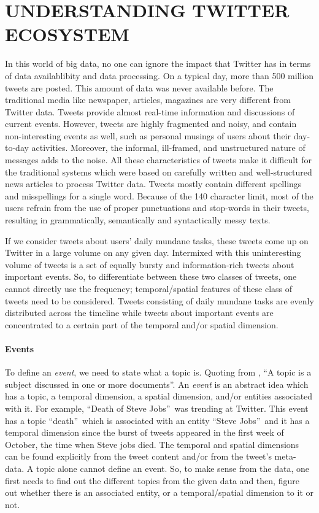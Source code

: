 \section{\uppercase{Understanding Twitter Ecosystem}}
In this world of big data, no one can ignore the impact that Twitter has in terms of data availablibity and data processing. On a typical day, more than 500 million tweets are posted. This amount of data was never available before. The traditional media like newspaper, articles, magazines are very different from Twitter data. Tweets provide almost real-time information and discussions of current events. However, tweets are highly fragmented and noisy, and contain non-interesting events as well, such as personal musings of users about their day-to-day activities. Moreover, the informal, ill-framed, and unstructured nature of messages adds to the noise. All these characteristics of tweets make it difficult for the traditional systems which were based on carefully written and well-structured news articles to process Twitter data. Tweets mostly contain different spellings and misspellings for a single word. Because of the 140 character limit, most of the users refrain from the use of proper punctuations and stop-words in their tweets, resulting in grammatically, semantically and syntactically messy texts.

If we consider tweets about users' daily mundane tasks, these tweets come up on Twitter in a large volume on any given day. Intermixed with this uninteresting volume of tweets is a set of equally bursty and information-rich tweets about important events. So, to differentiate between these two classes of tweets, one cannot directly use the frequency; temporal/spatial features of these class of tweets need to be considered. Tweets consisting of daily mundane tasks are evenly distributed across the timeline while tweets about important events are concentrated to a certain part of the temporal and/or spatial dimension.

\paragraph{Events}
To define an \emph{event}, we need to state what a topic is. Quoting from \cite{zhao2011comparing}, \textquotedblleft A topic is a subject discussed in one or more documents\textquotedblright. An \emph{event} is an abstract idea which has a topic, a temporal dimension, a spatial dimension, and/or entities associated with it. For example, \textquotedblleft Death of Steve Jobs\textquotedblright~was trending at Twitter. This event has a topic \textquotedblleft death\textquotedblright~which is associated with an entity \textquotedblleft Steve Jobs\textquotedblright~and it has a temporal dimension since the burst of tweets appeared in the first week of October, the time when Steve jobs died. The temporal and spatial dimensions can be found explicitly from the tweet content and/or from the tweet's meta-data. A topic alone cannot define an event. So, to make sense from the data, one first needs to find out the different topics from the given data and then, figure out whether there is an associated entity, or a temporal/spatial dimension to it or not.